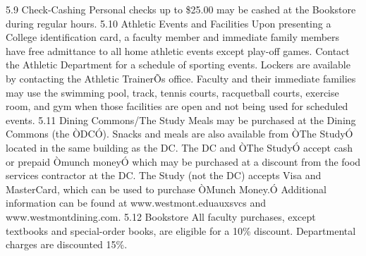 \documentclass[letterpaper, 11pt]{article}
\begin{document}
	5.9 Check-Cashing
	Personal checks up to \$25.00 may be cashed at the Bookstore during regular hours.
	5.10 Athletic Events and Facilities
	Upon presenting a College identification card, a faculty member and immediate family members have free admittance to all home athletic events except play-off games.  Contact the Athletic Department for a schedule of sporting events.  Lockers are available by contacting the Athletic TrainerÕs office.  Faculty and their immediate families may use the swimming pool, track, tennis courts, racquetball courts, exercise room, and gym when those facilities are open and not being used for scheduled events.
	5.11 Dining Commons/The Study
	Meals may be purchased at the Dining Commons (the ÒDCÓ).  Snacks and meals are also available from ÒThe StudyÓ located in the same building as the DC.  The DC and ÒThe StudyÓ accept cash or prepaid Òmunch moneyÓ which may be purchased at a discount from the food services contractor at the DC.  The Study (not the DC) accepts Visa and MasterCard, which can be used to purchase ÒMunch Money.Ó  Additional information can be found at www.westmont.eduauxsvcs and www.westmontdining.com.
	5.12 Bookstore
	All faculty purchases, except textbooks and special-order books, are eligible
	for a 10\% discount.  Departmental charges are discounted 15\%.
\end{document}

